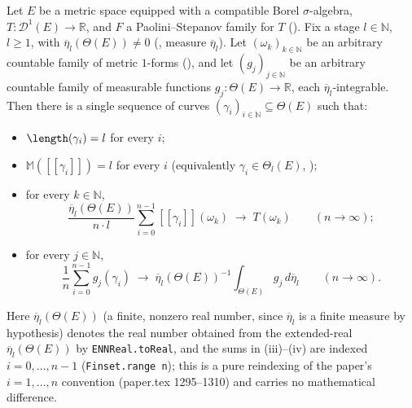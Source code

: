 \begin{lemma}\label{SLLNCurves}
  Let $E$ be a metric space equipped with a compatible Borel $\sigma$-algebra,
  $T \colon \mathcal{D}^1(E) \to \mathbb{R}$, and $F$ a Paolini--Stepanov family for $T$
  (). Fix a stage $l \in \mathbb{N}$, $l \ge 1$, with
  $\overline{\eta}_l(\Theta(E)) \ne 0$ (, measure $\overline{\eta}_l$).
  Let $(\omega_k)_{k \in \mathbb{N}}$ be an arbitrary countable family of metric $1$-forms
  (), and let $(g_j)_{j \in \mathbb{N}}$ be an arbitrary countable family of
  measurable functions $g_j \colon \Theta(E) \to \mathbb{R}$, each $\overline{\eta}_l$-integrable.
  Then there is a single sequence of curves $(\gamma_i)_{i \in \mathbb{N}} \subseteq \Theta(E)$
  such that:
  \begin{itemize}
    \item[(i)] $\length(\gamma_i) = l$ for every $i$;
    \item[(ii)] $\mathbb{M}([[\gamma_i]]) = l$ for every $i$ (equivalently $\gamma_i \in
      \Theta_l(E)$, );
    \item[(iii)] for every $k \in \mathbb{N}$,
      \[
        \frac{\overline{\eta}_l(\Theta(E))}{n \cdot l} \sum_{i=0}^{n-1} [[\gamma_i]](\omega_k)
        \;\longrightarrow\; T(\omega_k)
        \qquad (n \to \infty)
        ;
      \]
    \item[(iv)] for every $j \in \mathbb{N}$,
      \[
        \frac{1}{n} \sum_{i=0}^{n-1} g_j(\gamma_i)
        \;\longrightarrow\; \overline{\eta}_l(\Theta(E))^{-1} \int_{\Theta(E)} g_j \, d\overline{\eta}_l
        \qquad (n \to \infty)
        .
      \]
  \end{itemize}
  Here $\overline{\eta}_l(\Theta(E))$ (a finite, nonzero real number, since $\overline{\eta}_l$ is a
  finite measure by hypothesis) denotes the real number obtained from the extended-real
  $\overline{\eta}_l(\Theta(E))$ by \texttt{ENNReal.toReal}, and the sums in (iii)--(iv) are
  indexed $i=0,\dots,n-1$ (\texttt{Finset.range n}); this is a pure reindexing of the paper's
  $i=1,\dots,n$ convention (paper.tex 1295--1310) and carries no mathematical difference.


\end{lemma}

